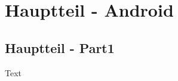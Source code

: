 \newpage
\section{Hauptteil - Android} \label{sec:hauptteil_android}
\subsection{Hauptteil - Part1}
Text




